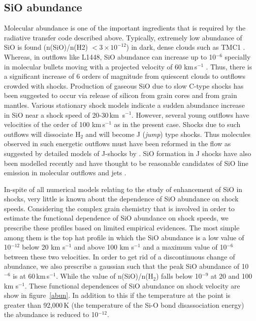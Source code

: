 \documentclass[useAMS,usenatbib,letters]{mn2e}
\begin{document}
\subsection{SiO abundance}
\label{ssec:sioabun}
Molecular abundance is one of the important ingredients that is
required by the radiative transfer code described above. 
Typically, extremely low abundance of SiO is
found (n(SiO)/n(H2) $< 3\times10^{-12}$) in dark, dense clouds such
as TMC1 \citep{Ziurys:1989p14699,MartinPintado:1992p14309}. Whereas, in
outflows like L1448, SiO abundance can increase up to 10$^{-6}$ specially in
molecular bullets moving with a projected velocity of 60
km\,s$^{-1}$ \citep{Dutrey:1997p11185}. Thus, there is
a significant increase of 6 orders of magnitude from quiescent clouds
to outflows crowded with shocks. Production of
gaseous SiO due to slow C-type shocks has been suggested to occur via release of
silicon from grain cores and from grain mantles. Various stationary
shock models indicate a sudden abundance increase in SiO 
near a shock speed of 20-30\,km\, s$^{-1}$. However, several young
outflows have velocities of the order of 100 km\,s$^{-1}$ as in the present
case. Shocks due to such outflows will dissociate H$_{2}$ and will
become J ({\em{jump}}) type shocks. Thus molecules observed in such
energetic outflows must have been reformed in the flow as suggested by
detailed models of J-shocks by \cite{Neufeld:1989p14322}. SiO formation in J shocks
have also been modelled recently and have thought to be reasonable
candidates of SiO line emission in molecular outflows and jets
\citep{Guillet:2009p11229}.
%

In-spite of all numerical models relating to the study of enhancement
of SiO in shocks, very little is known about the dependence of SiO
abundance on shock speeds. Considering the complex grain
chemistry that is involved in order to estimate the functional
dependence of SiO abundance on shock speeds, we prescribe these
profiles based on limited empirical evidences. The most simple among
them is the top hat profile in which the SiO abundance is a low value of
10$^{-12}$ below 20 km s$^{-1}$ and above 100 km s$^{-1}$ and a
maximum value of 10$^{-6}$ between these two velocities.
In order to get rid of a discontinuous change of abundance, we also
prescribe a gaussian such that the peak SiO abundance of 10$^{-6}$ is at
60\,km\,s$^{-1}$. While the value of n(SiO)/n(H$_{2}$) falls below
10$^{-9}$ at 20 and 100 km s$^{-1}$. These functional dependences of SiO
abundance on shock velocity are show in figure~\ref{abun}.  
In addition to this if the temperature at the point is greater than
92,000\,K (the temperature of the Si-O bond disassociation energy) 
the abundance is reduced to 10$^{-12}$. 
%
\end{document}
